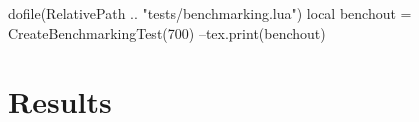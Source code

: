 \documentclass[oneside]{memoir}
\begin{document}
\pagestyle{empty}

\begin{luacode*}
	dofile(RelativePath .. "tests/benchmarking.lua")
	local benchout = CreateBenchmarkingTest(700)
	--tex.print(benchout)
\end{luacode*}

\chapter{Results}

\PrintRpgTexErrors

\PrintRpgTexBenchmarking
\end{document}
